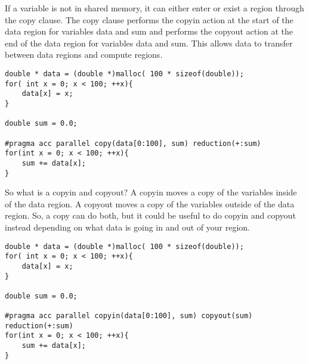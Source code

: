 If a variable is not in shared memory, it can either enter or exist a region through the copy clause. The copy clause performs the copyin action at the start of the data region for variables data and sum and performs the copyout action at the end of the data region for variables data and sum. This allows data to transfer between data regions and compute regions.

\begin{Code}
\begin{lstlisting}[frame=single, caption=copy.c, label=prototype, numbers=none]
double * data = (double *)malloc( 100 * sizeof(double));
for( int x = 0; x < 100; ++x){
	data[x] = x;	    
}

double sum = 0.0;

#pragma acc parallel copy(data[0:100], sum) reduction(+:sum)
for(int x = 0; x < 100; ++x){
	sum += data[x];
}
\end{lstlisting}
\end{Code}

So what is a copyin and copyout? A copyin moves a copy of the variables inside of the data region. A copyout moves a copy of the variables outside of the data region. So, a copy can do both, but it could be useful to do copyin and copyout instead depending on what data is going in and out of your region.

\begin{Code}
\begin{lstlisting}[frame=single, caption=copyinCopyout.c, label=prototype, numbers=none]
double * data = (double *)malloc( 100 * sizeof(double));
for( int x = 0; x < 100; ++x){
	data[x] = x;	    
}

double sum = 0.0;

#pragma acc parallel copyin(data[0:100], sum) copyout(sum) reduction(+:sum)
for(int x = 0; x < 100; ++x){
	sum += data[x];
}
\end{lstlisting}
\end{Code}
